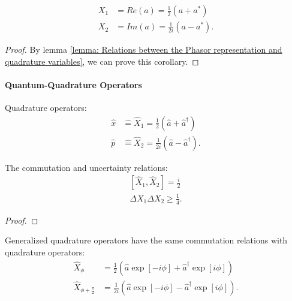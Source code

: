 \documentclass[../../note.tex]{subfiles}
\begin{document}
\begin{corollary}
    \begin{align}
        X_1
        &= Re(a) = \frac{1}{2} \left(a+a^\ast\right) \\
        X_2
        &= Im(a) = \frac{1}{2 i} \left(a - a^\ast\right).
    \end{align}
\end{corollary}
\begin{proof}
    By lemma \ref{lemma: Relations between the Phasor representation and quadrature variables}, we can prove this corollary.
\end{proof}

\paragraph{Quantum-Quadrature Operators}
\begin{definition}
    Quadrature operators:
    \begin{align}
        \hat{x}
        &\hat{=} \hat{X}_1 = \frac{1}{2} \left(\hat{a} + \hat{a}^\dagger \right) \\
        \hat{p}
        &\hat{=} \hat{X}_2 = \frac{1}{2 i} \left(\hat{a} - \hat{a}^\dagger\right).
    \end{align}
\end{definition}

\begin{lemma}
    The commutation and uncertainty relations:
    \begin{align}
        \left[\hat{X}_1, \hat{X}_2\right] = \frac{i}{2} \\
        \Delta X_1 \Delta X_2 \geq \frac{1}{4}.
    \end{align}
\end{lemma}
\begin{proof}
    
\end{proof}

\begin{definition}
    \label{def: Generalized  quadrature operators}
    Generalized  quadrature operators have the same commutation relations with quadrature operators:
    \begin{align}
        \hat{X}_{\phi}
        &= \frac{1}{2} \left(\hat{a} \exp\left[-i \phi\right] + \hat{a}^\dagger \exp\left[i \phi\right]\right) \\
        \hat{X}_{\phi + \frac{\pi}{2}}
        &= \frac{1}{2 i} \left(\hat{a} \exp\left[-i \phi\right] - \hat{a}^\dagger \exp\left[i \phi\right]\right).
    \end{align}
\end{definition}
\end{document}
